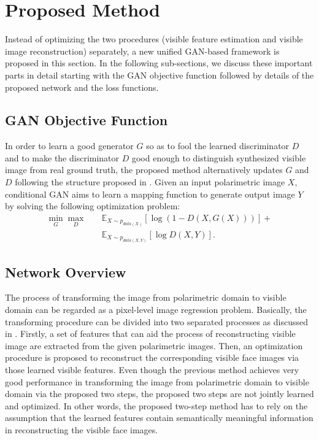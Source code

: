 \documentclass[10pt,twocolumn,letterpaper]{article}
\begin{document}
\section{Proposed Method}
Instead of optimizing the two procedures (visible feature estimation and visible image reconstruction) separately, a new unified GAN-based framework is proposed in this section. In the following sub-sections, we discuss these important parts in detail starting with the GAN objective function followed by details of the proposed network and the loss functions.

\subsection{GAN Objective Function}
In order to learn a good generator $G$ so as to fool the learned discriminator $D$ and  to make the discriminator $D$ good enough to distinguish synthesized visible image from real ground truth,  the proposed method alternatively updates $G$ and $D$ following the structure proposed in \cite{GAN_pix2pix2016,derain_2017_zhang}. Given an input polarimetric image $X$, conditional GAN aims to learn a mapping function to generate output image $Y$ by solving the following optimization problem:
\begin{equation}\label{eq:GAN1}
\begin{split}
\min_G \max_D \quad & \mathbb E _{X\sim p_{data(X)} }[\log (1- D(X, G(X)))]+\\
&\mathbb E _{X\sim p_{data(X,Y)}}[\log D(X,Y)].
\end{split}
 \end{equation}


 
 
\subsection{Network Overview}
The process of transforming  the image from polarimetric domain to visible domain can be regarded as a pixel-level image regression problem.  Basically, the transforming procedure can be divided into two separated processes as discussed in \cite{btas_2016}. Firstly,  a set of features that can aid the process of reconstructing visible image are extracted from the given polarimetric images.  Then, an optimization procedure is proposed to reconstruct the corresponding visible face images via those learned visible features.  Even though the previous method \cite{btas_2016} achieves very good performance in transforming the image from polarimetric domain to visible domain via the proposed two steps, the proposed two steps are not jointly learned and optimized.  In other words, the proposed two-step method has to rely on the assumption that the learned features contain semantically meaningful information in reconstructing the visible face images. 
\end{document}
